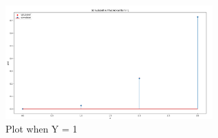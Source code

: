 \documentclass[journal,12pt,twocolumn]{IEEEtran}
\begin{document}
\begin{figure}[htp]
    \centering
    \includegraphics[width=8cm]{assignment2_plot2}
    \caption{Plot when Y = 1}
    \label{fig:2}
\end{figure}
\end{document}
